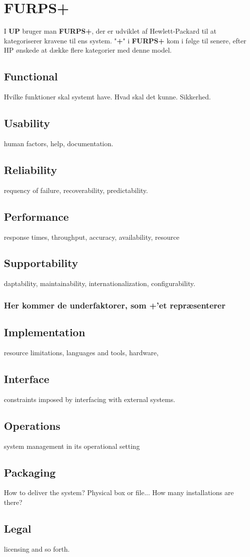 \section{FURPS+}
I \textbf{UP} bruger man \textbf{FURPS+}, der er udviklet af Hewlett-Packard til at kategoriserer kravene til ens system. "\textbf{+}" i \textbf{FURPS+} kom i følge \cite{WikiFURPS} til senere, efter HP ønskede at dække flere kategorier med denne model.
\subsection{Functional}
Hvilke funktioner skal systemt have. Hvad skal det kunne. Sikkerhed.
\subsection{Usability}
human factors, help, documentation.
\subsection{Reliability}
requency of failure, recoverability, predictability.
\subsection{Performance}
response times, throughput, accuracy, availability, resource
\subsection{Supportability}
daptability, maintainability, internationalization, configurability.
\subsubsection*{Her kommer de underfaktorer, som +'et repræsenterer}
\subsection{Implementation}
resource limitations, languages and tools, hardware,
\subsection{Interface}
constraints imposed by interfacing with external systems.
\subsection{Operations}
system management in its operational setting
\subsection{Packaging}
How to deliver the system? Physical box or file...
How many installations are there?
\subsection{Legal}
licensing and so forth.